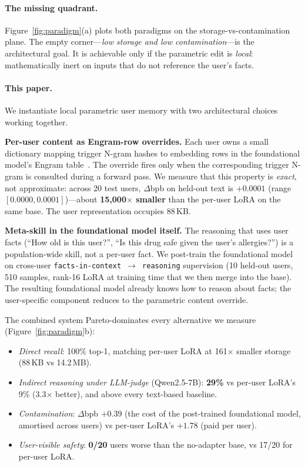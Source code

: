 \documentclass{article}
\begin{document}
\paragraph{The missing quadrant.}
Figure~\ref{fig:paradigm}(a) plots both paradigms on the
storage-vs-contamination plane. The empty corner—\emph{low storage and
low contamination}—is the architectural goal. It is achievable only if
the parametric edit is \emph{local}: mathematically inert on inputs
that do not reference the user's facts.

\paragraph{This paper.}
We instantiate local parametric user memory with two architectural
choices working together.

\textbf{Per-user content as Engram-row overrides.} Each user owns a
small dictionary mapping trigger N-gram hashes to embedding rows in
the foundational model's Engram table~\citep{cheng2026engram}. The
override fires only when the corresponding trigger N-gram is consulted
during a forward pass. We measure that this property is \emph{exact},
not approximate: across 20 test users, $\Delta$bpb on held-out text
is $+0.0001$ (range $[0.0000, 0.0001]$)—about
\textbf{15{,}000$\times$ smaller} than the per-user LoRA on the same
base. The user representation occupies 88\,KB.

\textbf{Meta-skill in the foundational model itself.} The reasoning
that uses user facts (``How old is this user?'', ``Is this drug safe
given the user's allergies?'') is a population-wide skill, not a
per-user fact. We post-train the foundational model on cross-user
\texttt{facts-in-context $\to$ reasoning} supervision (10 held-out
users, 510 samples, rank-16 LoRA at training time that we then merge
into the base). The resulting foundational model already knows how to
reason about facts; the user-specific component reduces to the
parametric content override.

The combined system Pareto-dominates every alternative we measure
(Figure~\ref{fig:paradigm}b):
\begin{itemize}[leftmargin=*,topsep=2pt,itemsep=1pt]
  \item \emph{Direct recall}: 100\% top-1, matching per-user LoRA
        at 161$\times$ smaller storage (88\,KB vs 14.2\,MB).
  \item \emph{Indirect reasoning under LLM-judge} (Qwen2.5-7B):
        \textbf{29\%} vs per-user LoRA's 9\% (3.3$\times$ better),
        and above every text-based baseline.
  \item \emph{Contamination}: $\Delta$bpb $+0.39$ (the cost of the
        post-trained foundational model, amortised across users) vs
        per-user LoRA's $+1.78$ (paid per user).
  \item \emph{User-visible safety}: \textbf{0/20} users worse than the
        no-adapter base, vs 17/20 for per-user LoRA.
\end{itemize}
\end{document}

